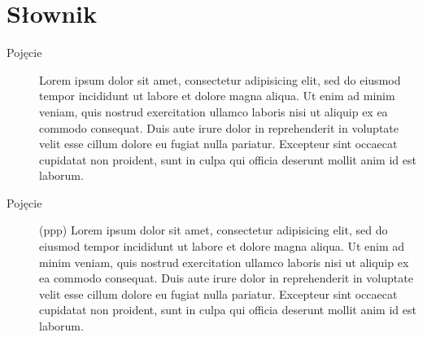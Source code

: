 \documentclass[a4paper,titlepage,twoside,openright]{report} %
\begin{document}
\cleardoublepage

\chapter*{Słownik}
		
		\begin{description}
			\item[Pojęcie]
				Lorem ipsum dolor sit amet, consectetur adipisicing elit, sed do eiusmod tempor incididunt 
				ut labore et dolore magna aliqua. Ut enim ad 	minim veniam, quis nostrud exercitation 
				ullamco laboris nisi ut aliquip ex ea commodo consequat. Duis aute irure dolor in reprehenderit 
				in voluptate velit esse cillum dolore eu fugiat nulla pariatur. Excepteur sint occaecat 
				cupidatat non proident, sunt in culpa qui officia deserunt mollit anim id est laborum.				
			\item[Pojęcie] (ppp) 
				Lorem ipsum dolor sit amet, consectetur adipisicing elit, sed do eiusmod tempor incididunt 
				ut labore et dolore magna aliqua. Ut enim ad 	minim veniam, quis nostrud exercitation 
				ullamco laboris nisi ut aliquip ex ea commodo consequat. Duis aute irure dolor in reprehenderit 
				in voluptate velit esse cillum dolore eu fugiat nulla pariatur. Excepteur sint occaecat 
				cupidatat non proident, sunt in culpa qui officia deserunt mollit anim id est laborum.
		\end{description}
	
\end{document}
